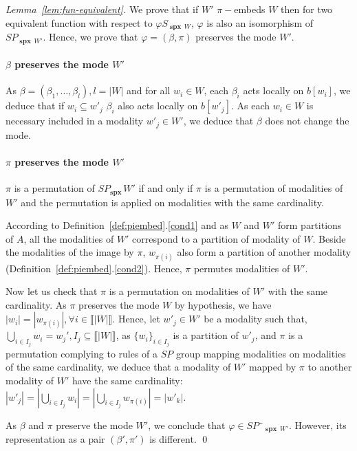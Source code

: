 \documentclass[12pt]{elsarticle}
\newcommand{\spectrum}[0]{{\operatorname{\textbf{spx}}\,}}
\begin{document}
\begin{proof}[Lemma~\ref{lem:fun-equivalent}]
We prove that if $W'$ $\pi-$embeds $W$ then for two equivalent function with respect to $\varphi S_{\spectrum W}$, $\varphi$ is also an isomorphism of $SP_{\spectrum W'}$. Hence, we prove that $\varphi=(\beta,\pi)$ preserves the mode $W'$.

\paragraph{$\beta$ preserves the mode $W'$}
As $\beta=(\beta_1,\ldots,\beta_l), l =|W|$ and for all $w_i \in W$, each $\beta_i$ acts locally on $b[w_i]$, we deduce that if $w_i \subseteq w'_j$ $\beta_i$ also acts locally on $b[w'_j]$. As each $w_i \in W$ is necessary included in a modality $w'_j \in W'$, we deduce that $\beta$ does not change the mode. 

\paragraph{$\pi$ preserves the mode $W'$}
$\pi$ is a permutation of $SP_\spectrum{W'}$ if and only if $\pi$ is a permutation of modalities of $W'$ and the permutation is applied on modalities with the same cardinality.

\medskip
According to Definition~\ref{def:piembed}.\ref{cond1} and as $W$ and $W'$ form partitions of $A$, all the modalities of $W'$ correspond to a partition of modality of $W$. Beside the modalities of the image by $\pi$, $w_{\pi(i)}$ also form a partition of another modality (Definition~\ref{def:piembed}.\ref{cond2}). Hence, $\pi$ permutes modalities of $W'$.

Now let us check that $\pi$ is a permutation on modalities of $W'$ with the same cardinality.
As $\pi$ preserves the mode $W$ by hypothesis, we have $|w_i|=|w_{\pi(i)}|, \forall i \in \llbracket |W| \rrbracket$. Hence, let $w'_j \in W'$ be a modality such that, 
$\bigcup_{i \in I_j} w_i = w_j', I_j \subseteq \llbracket |W| \rrbracket$, as $\{w_i\}_{i \in I_j}$ is a partition of $w'_j$,
and $\pi$ is a permutation complying to rules of a $SP$ group mapping modalities on modalities of the same cardinality, we deduce that a modality of $W'$ mapped by $\pi$ to another modality of $W'$ have the same cardinality: 
$|w'_j|=|\bigcup_{i \in I_j} w_i|=|\bigcup_{i \in I_j} w_{\pi(i)}|=|w'_k|$. 

\medskip
As $\beta$ and $\pi$ preserve the mode $W'$, we conclude that $\varphi \in SP¨_{\spectrum W'}$. However, its representation as a pair $(\beta',\pi')$ is different. 
\qed \end{proof}

\pagebreak

	
\end{document}
